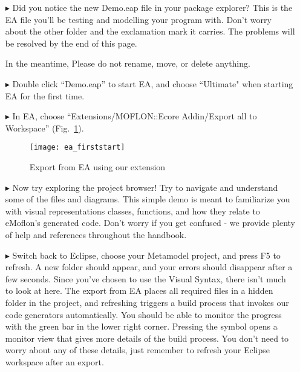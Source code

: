 \newpage
\visHeader

\begin{itemize}
\FloatBarrier
\item[$\blacktriangleright$] Did you notice the new Demo.eap file in your package explorer? This is the EA file you'll be testing and modelling your program with. Don't worry about the other folder and the exclamation mark it carries. The problems will be resolved by the end of this page.

In the meantime, Please do not rename, move, or delete anything.

\item[$\blacktriangleright$] Double click ``Demo.eap'' to start EA, and choose ``Ultimate" when starting EA for the first time.

\item[$\blacktriangleright$] In EA, choose ``Extensions/MOFLON::Ecore Addin/Export\- all\- to\- Workspace'' (Fig.~\ref{fig_ea}).

\vspace{1cm}

\begin{figure}[htbp]
	\centering
  \texttt{[image: ea\_firststart]}
	\caption{Export from EA using our extension} 
	\label{fig_ea} 
\end{figure}

\vspace{1cm}

\item[$\blacktriangleright$] Now try exploring the project browser! Try to navigate and understand some of the files and diagrams. This simple demo is meant to familiarize you with visual representations classes, functions, and how they relate to eMoflon's generated code. Don't worry if you get confused - we provide plenty of help and references throughout the handbook.
  
\item[$\blacktriangleright$] Switch back to Eclipse, choose your Metamodel project, and press F5 to refresh. A new folder should appear, and your errors should disappear after a few seconds. Since you've chosen to use the Visual Syntax, there isn't much to look at here. The export from EA places all required files in a hidden folder in the project, and refreshing triggers a build process that invokes our code generators automatically. 
You should be able to monitor the progress with the green bar in the lower right corner. Pressing the symbol opens a monitor view that gives more details of the build process. You don't need to worry about any of these details, just remember to refresh your Eclipse workspace after an export.

\end{itemize}